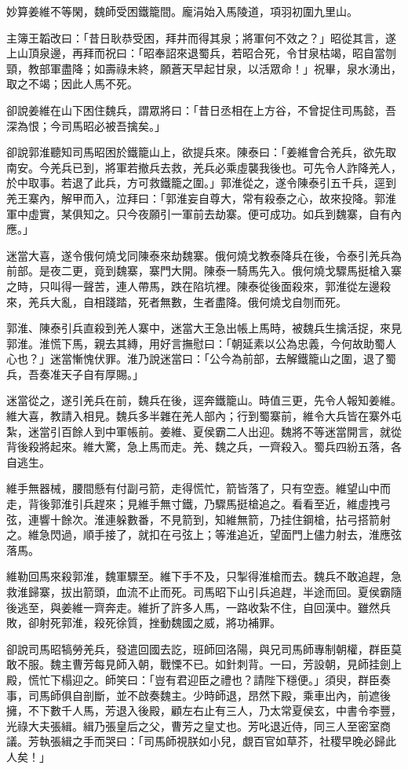 妙算姜維不等閑，魏師受困鐵籠間。龐涓始入馬陵道，項羽初圍九里山。

主簿王韜改曰：「昔日耿恭受困，拜井而得其泉；將軍何不效之？」昭從其言，遂上山頂泉邊，再拜而祝曰：「昭奉詔來退蜀兵，若昭合死，令甘泉枯竭，昭自當刎頸，教部軍盡降；如壽祿未終，願蒼天早起甘泉，以活眾命！」祝畢，泉水湧出，取之不竭；因此人馬不死。

卻說姜維在山下困住魏兵，謂眾將曰：「昔日丞相在上方谷，不曾捉住司馬懿，吾深為恨；今司馬昭必被吾擒矣。」

卻說郭淮聽知司馬昭困於鐵籠山上，欲提兵來。陳泰曰：「姜維會合羌兵，欲先取南安。今羌兵已到，將軍若撤兵去救，羌兵必乘虛襲我後也。可先令人詐降羌人，於中取事。若退了此兵，方可救鐵籠之圍。」郭淮從之，遂令陳泰引五千兵，逕到羌王寨內，解甲而入，泣拜曰：「郭淮妄自尊大，常有殺泰之心，故來投降。郭淮軍中虛實，某俱知之。只今夜願引一軍前去劫寨。便可成功。如兵到魏寨，自有內應。」

迷當大喜，遂令俄何燒戈同陳泰來劫魏寨。俄何燒戈教泰降兵在後，令泰引羌兵為前部。是夜二更，竟到魏寨，寨門大開。陳泰一騎馬先入。俄何燒戈驟馬挺槍入寨之時，只叫得一聲苦，連人帶馬，跌在陷坑裡。陳泰從後面殺來，郭淮從左邊殺來，羌兵大亂，自相踐踏，死者無數，生者盡降。俄何燒戈自刎而死。

郭淮、陳泰引兵直殺到羌人寨中，迷當大王急出帳上馬時，被魏兵生擒活捉，來見郭淮。淮慌下馬，親去其縳，用好言撫慰曰：「朝延素以公為忠義，今何故助蜀人心也？」迷當慚愧伏罪。淮乃說迷當曰：「公今為前部，去解鐵籠山之圍，退了蜀兵，吾奏准天子自有厚賜。」

迷當從之，遂引羌兵在前，魏兵在後，逕奔鐵籠山。時值三更，先令人報知姜維。維大喜，教請入相見。魏兵多半雜在羌人部內；行到蜀寨前，維令大兵皆在寨外屯紮，迷當引百餘人到中軍帳前。姜維、夏侯霸二人出迎。魏將不等迷當開言，就從背後殺將起來。維大驚，急上馬而走。羌、魏之兵，一齊殺入。蜀兵四紛五落，各自逃生。

維手無器械，腰間懸有付副弓箭，走得慌忙，箭皆落了，只有空壼。維望山中而走，背後郭淮引兵趕來；見維手無寸鐵，乃驟馬挺槍追之。看看至近，維虛拽弓弦，連響十餘次。淮連躲數番，不見箭到，知維無箭，乃挂住鋼槍，拈弓搭箭射之。維急閃過，順手接了，就扣在弓弦上；等淮追近，望面門上儘力射去，淮應弦落馬。

維勒回馬來殺郭淮，魏軍驟至。維下手不及，只掣得淮槍而去。魏兵不敢追趕，急救淮歸寨，拔出箭頭，血流不止而死。司馬昭下山引兵追趕，半途而回。夏侯霸隨後逃至，與姜維一齊奔走。維折了許多人馬，一路收紮不住，自回漢中。雖然兵敗，卻射死郭淮，殺死徐質，挫動魏國之威，將功補罪。

卻說司馬昭犒勞羌兵，發遣回國去訖，班師回洛陽，與兄司馬師專制朝權，群臣莫敢不服。魏主曹芳每見師入朝，戰慄不已。如針刺背。一曰，芳設朝，見師挂劍上殿，慌忙下榻迎之。師笑曰：「豈有君迎臣之禮也？請陛下穩便。」須臾，群臣奏事，司馬師俱自剖斷，並不啟奏魏主。少時師退，昂然下殿，乘車出內，前遮後擁，不下數千人馬，芳退入後殿，顧左右止有三人，乃太常夏侯玄，中書令李豐，光祿大夫張緝。緝乃張皇后之父，曹芳之皇丈也。芳叱退近侍，同三人至密室商議。芳執張緝之手而哭曰：「司馬師視朕如小兒，覷百官如草芥，社稷早晚必歸此人矣！」

